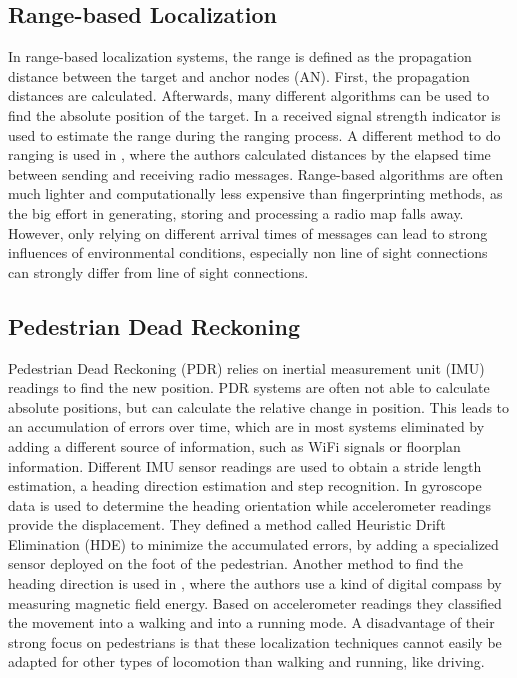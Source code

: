 \subsection{Range-based Localization}
In range-based localization systems, the range is defined as the propagation distance between the target and anchor nodes (AN). First, the propagation distances are calculated. Afterwards, many different algorithms can be used to find the absolute position of the target. In \cite{Horus} a received signal strength indicator is used to estimate the range during the ranging process. A different method to do ranging is used in \cite{IEEE}, where the authors calculated distances by the elapsed time between sending and receiving radio messages. Range-based algorithms are often much lighter and computationally less expensive than fingerprinting methods, as the big effort in generating, storing and processing a radio map falls away. However, only relying on different arrival times of messages can lead to strong influences of environmental conditions, especially non line of sight connections can strongly differ from line of sight connections.

\subsection{Pedestrian Dead Reckoning}
Pedestrian Dead Reckoning (PDR) relies on inertial measurement unit (IMU) readings to find the new position. PDR systems are often not able to calculate absolute positions, but can calculate the relative change in position. This leads to an accumulation of errors over time, which are in most systems eliminated by adding a different source of information, such as WiFi signals or floorplan information. Different IMU sensor readings are used to obtain a stride length estimation, a heading direction estimation and step recognition. In \cite{Borestein} gyroscope data is used to determine the heading orientation while accelerometer readings provide the displacement. They defined a method called Heuristic Drift Elimination (HDE) to minimize the accumulated errors, by adding a specialized sensor deployed on the foot of the pedestrian. Another method to find the heading direction is used in \cite{Kakiuchi}, where the authors use a kind of digital compass by measuring magnetic field energy. Based on accelerometer readings they classified the movement into a walking and into a running mode. A disadvantage of their strong focus on pedestrians is that these localization techniques cannot easily be adapted for other types of locomotion than walking and running, like driving.  

